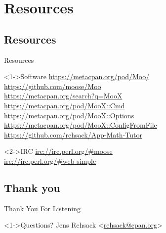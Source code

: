 \documentclass[ngerman,xcolor={table,dvipsnames},smaller,compress,hyperref={bookmarks,colorlinks}]{beamer}
\begin{document}



\section{Resources}

\subsection{Resources}

\begin{frame}[t,fragile]{Resources}
\begin{block}<1->{Software}
\url{https://metacpan.org/pod/Moo/} \\
\url{https://github.com/moose/Moo} \\
\url{https://metacpan.org/search?q=MooX} \\
\url{https://metacpan.org/pod/MooX::Cmd} \\
\url{https://metacpan.org/pod/MooX::Options} \\
\url{https://metacpan.org/pod/MooX::ConfigFromFile} \\
\url{https://github.com/rehsack/App-Math-Tutor}
\end{block}

\begin{block}<2->{IRC}
\url{irc://irc.perl.org/#moose} \\
\url{irc://irc.perl.org/#web-simple}
\end{block}
\end{frame}

\subsection{Thank you}

\begin{frame}[fragile]{Thank You For Listening}
\begin{block}<1->{Questions?}
Jens Rehsack \textless{}\href{mailto:rehsack@cpan.org}{rehsack@cpan.org}\textgreater{}
\end{block}
\end{frame}
\end{document}
